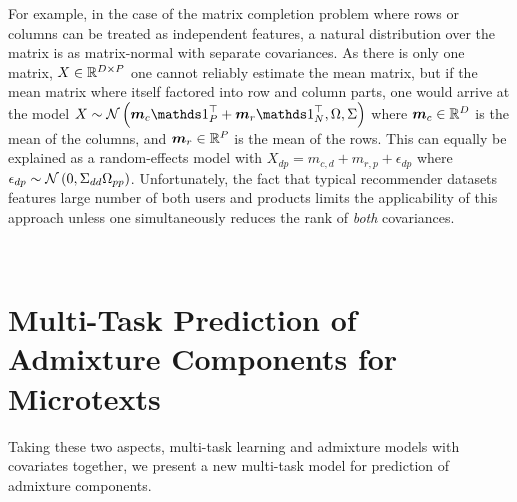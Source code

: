 For example, in the case of the matrix completion problem where rows or columns can be treated as independent features, a natural distribution over the matrix is as matrix-normal with separate covariances. As there is only one matrix, $X \in { \mathbb{R}^{D \times P} }$ one cannot reliably estimate the mean matrix, but if the mean matrix where itself factored into row and column parts, one would arrive at the model\cite{Allen2010}  $X \sim \mnor{\vv{m}_c \one_P\T + \vv{m}_r \one_N\T}{\Omega}{\Sigma}$ where $\bm m_c \in { \mathbb{R}^{D} }$ is the mean of the columns, and $\bm m_r \in { \mathbb{R}^{P} }$ is the mean of the rows. This can equally be explained as a random-effects model with $X_{dp} = m_{c,d} + m_{r,p} + \epsilon_{dp}$ where $\epsilon_{dp} \sim \mathcal{N} \left( {0}, {\Sigma_{dd}\Omega_{pp}} \right)$. Unfortunately, the fact that typical recommender datasets features large number of both users and products limits the applicability of this approach unless one simultaneously reduces the rank of \emph{both} covariances.




\

\section{Multi-Task Prediction of Admixture Components for Microtexts}
Taking these two aspects, multi-task learning and admixture models with covariates together, we present a new multi-task model for prediction of admixture components.

